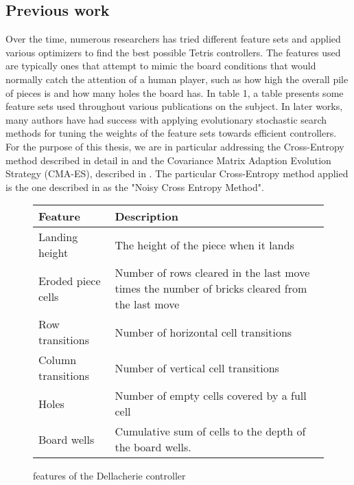 \subsection{Previous work}
Over the time, numerous researchers has tried different feature 
sets and applied various optimizers to find the best 
possible Tetris controllers. The features used are typically
ones that attempt to mimic the board conditions that would
normally catch the attention of a human player, such as
how high the overall pile of pieces is and how many holes 
the board has. In \citep{scherrer2009:b} table 1, a table 
presents some feature sets used throughout various publications
on the subject. In later works, many authors have had success
with applying evolutionary stochastic search methods for tuning 
the weights of the feature sets towards
efficient controllers. For the purpose of this thesis,
we are in particular addressing the
Cross-Entropy method described in detail in \citep{cetut2014} and the
Covariance Matrix Adaption Evolution Strategy (CMA-ES), described 
in \citep{hansen2011}. The particular Cross-Entropy method applied 
is the one described in \citep{szita:06} as the "Noisy Cross Entropy Method".\\

\begin{figure}[h!]
\begin{center}
\begin{tabular}{| l | p{8cm} |}
\hline
\textbf{Feature} & \textbf{Description}\\
\hline
Landing height & The height of the piece when it lands\\
\hline
Eroded piece cells & Number of rows cleared in the last move
times the number of bricks cleared from the last move\\
\hline
Row transitions & Number of horizontal cell transitions\\
\hline
Column transitions & Number of vertical cell transitions \\
\hline
Holes & Number of empty cells covered by a full cell\\
\hline
Board wells & Cumulative sum of cells to the depth of
the board wells.\\
\hline
\end{tabular}
\end{center}
\caption{features of the Dellacherie controller \label{table:dellfeat}}
\end{figure}


